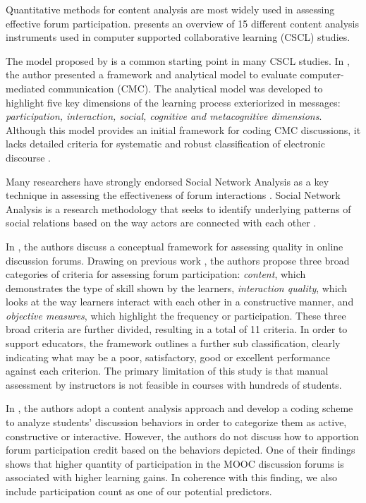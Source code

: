 Quantitative methods for content analysis are most widely used in
assessing effective forum participation. \cite{de2006content} presents
an overview of 15 different content analysis instruments used in 
computer supported collaborative learning (CSCL) studies.

The model proposed by \cite{henri1992computer} is a common starting
point in many CSCL studies. In \cite{henri1992computer}, the author presented a framework and analytical model to evaluate computer-mediated communication (CMC). The analytical model was developed to highlight five key dimensions of the learning process exteriorized in messages: 
{\em participation, interaction, social, cognitive and metacognitive dimensions}. Although this model provides an initial framework for coding CMC discussions, it lacks detailed criteria for systematic and robust classification of electronic discourse \cite{howell1996methodology}.


Many researchers have strongly endorsed Social Network Analysis as a
key technique in assessing the effectiveness of forum interactions
\cite{de2007investigating, yusof2009students,
  dowell2015modeling}. Social Network Analysis is a research
methodology that seeks to identify underlying patterns of social
relations based on the way actors are connected with each other
\cite{wasserman1994social, scott2011sage}.

 
In \cite{nandi2009conceptual}, the authors discuss a conceptual
framework for assessing quality in online discussion forums. Drawing
on previous work \cite{henri1992computer, newman1995content, garrison2001critical}, the authors propose three broad categories of criteria for assessing forum participation:{ \em content}, which demonstrates the type of skill shown by the learners,  {\em interaction quality}, which looks at the way learners interact with each other in a constructive manner, and {\em objective measures}, which highlight the frequency or participation. These three broad criteria are further divided, resulting in a total of 11 criteria. In order to support educators, the framework outlines a further sub classification, clearly indicating what may be a poor, satisfactory, good or excellent performance against each criterion. The primary limitation of this study is that manual assessment by instructors is not feasible in courses with hundreds of students.

In \cite{wang2015investigating}, the authors adopt a content analysis approach and develop a coding scheme to analyze students' discussion behaviors in order to categorize them as active, constructive or interactive. However, the authors do not discuss how to apportion forum participation credit based on the behaviors depicted. One of their findings shows that higher quantity of participation in the MOOC discussion forums is associated with higher learning gains. In coherence with this finding, we also include participation count as one of our potential predictors. 


